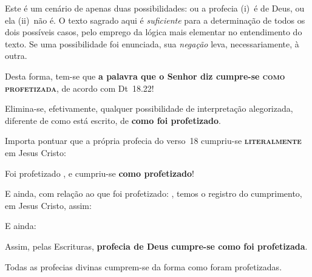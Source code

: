     Este é um cenário de apenas duas possibilidades: ou a profecia (i)~é de Deus, ou ela (ii)~não é.  O  texto  sagrado  aqui  é
    \emph{suficiente} para a determinação de  todos  os  dois  possíveis  casos,  pelo  emprego  da  lógica  mais  elementar  no
    entendimento do texto. Se uma possibilidade foi enunciada, sua \emph{negação} leva, necessariamente, à outra.

    Desta forma, tem-se que \textbf{a palavra que o Senhor diz cumpre-se \textsc{como profetizada}}, de acordo com Dt~18.22!

    Elimina-se, efetivamente,  qualquer  possibilidade  de  interpretação  alegorizada,  diferente  de  como  está  escrito,  de
    \textbf{como foi profetizado}.

    Importa pontuar que a própria profecia do verso~18 cumpriu-se \textbf{\textsc{literalmente}} em Jesus Cristo:
 

    Foi profetizado , e cumpriu-se \textbf{como profetizado}!

    E ainda, com relação ao que foi profetizado: , temos o registro do
    cumprimento, em Jesus Cristo, assim:


    E ainda:


    Assim, pelas Escrituras, \textbf{profecia de Deus cumpre-se como foi profetizada}.

    \begin{DEF}
        \label{def.pri.comoprof}
        Todas as profecias divinas cumprem-se da forma como foram profetizadas.
    \end{DEF}

